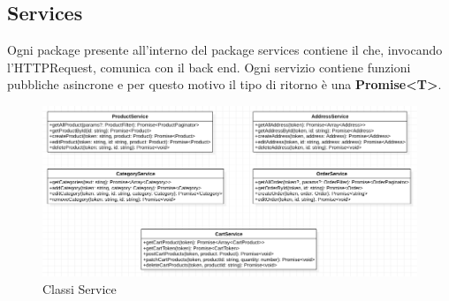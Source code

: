 \subsection{Services}
Ogni package presente all'interno del package services contiene il  che, invocando l'HTTPRequest, comunica con il back end. Ogni servizio contiene funzioni pubbliche asincrone e per questo motivo il tipo di ritorno è una \textbf{Promise<T>}.
\begin{figure}[H]
	\centering
	\includegraphics[scale=0.5]{Immagini/Frontend/ClassiService.png}
	\caption{Classi Service}
	\label{fig:feService}
\end{figure}
